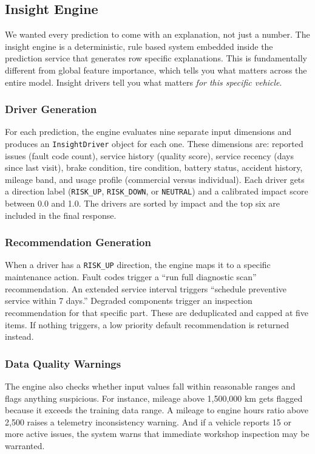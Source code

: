 \documentclass[conference]{IEEEtran}
\begin{document}
\subsection{Insight Engine}

We wanted every prediction to come with an explanation, not just a number. The insight engine is a deterministic, rule based system embedded inside the prediction service that generates row specific explanations. This is fundamentally different from global feature importance, which tells you what matters across the entire model. Insight drivers tell you what matters \textit{for this specific vehicle}.

\subsubsection{Driver Generation}
For each prediction, the engine evaluates nine separate input dimensions and produces an \texttt{InsightDriver} object for each one. These dimensions are: reported issues (fault code count), service history (quality score), service recency (days since last visit), brake condition, tire condition, battery status, accident history, mileage band, and usage profile (commercial versus individual). Each driver gets a direction label (\texttt{RISK\_UP}, \texttt{RISK\_DOWN}, or \texttt{NEUTRAL}) and a calibrated impact score between 0.0 and 1.0. The drivers are sorted by impact and the top six are included in the final response.

\subsubsection{Recommendation Generation}
When a driver has a \texttt{RISK\_UP} direction, the engine maps it to a specific maintenance action. Fault codes trigger a ``run full diagnostic scan'' recommendation. An extended service interval triggers ``schedule preventive service within 7 days.'' Degraded components trigger an inspection recommendation for that specific part. These are deduplicated and capped at five items. If nothing triggers, a low priority default recommendation is returned instead.

\subsubsection{Data Quality Warnings}
The engine also checks whether input values fall within reasonable ranges and flags anything suspicious. For instance, mileage above 1,500,000 km gets flagged because it exceeds the training data range. A mileage to engine hours ratio above 2,500 raises a telemetry inconsistency warning. And if a vehicle reports 15 or more active issues, the system warns that immediate workshop inspection may be warranted.
\end{document}
